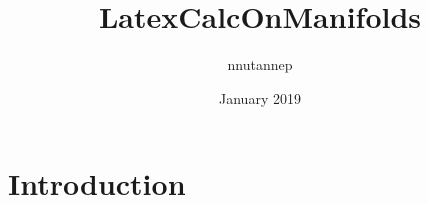 \documentclass{article}
\title{LatexCalcOnManifolds}
\author{nnutannep }
\date{January 2019}
\begin{document}
\maketitle

\section{Introduction}
\end{document}
